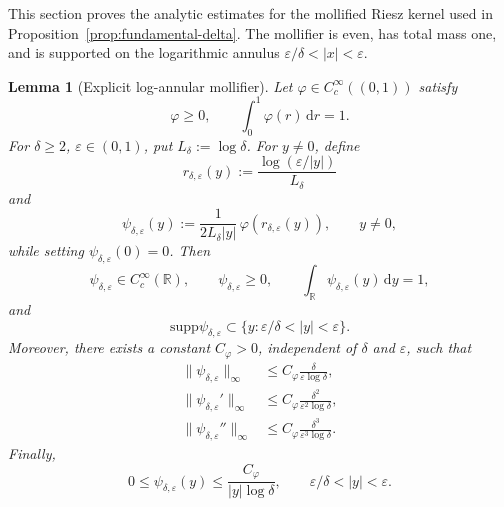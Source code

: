 \documentclass[10pt,a4paper]{amsart}
\newtheorem{lemma}[theorem]{Lemma}
\newcommand{\R}{\mathbb{R}}
\newcommand{\1}{\mathbf{1}}
\newcommand{\dd}{\,\mathrm{d}}
\newcommand{\eps}{\varepsilon}
\newcommand{\supp}{\mathrm{supp}}
\begin{document}
This section proves the analytic estimates for the mollified Riesz kernel used in Proposition~\ref{prop:fundamental-delta}. The mollifier is even, has total mass one, and is supported on the logarithmic annulus $\eps/\delta<|x|<\eps$.

\begin{lemma}[Explicit log-annular mollifier]
\label{lem:explicit-mollifier}
Let $\varphi\in C_c^\infty((0,1))$ satisfy
\[
  \varphi\ge0,\qquad \int_0^1\varphi(r)\dd r=1.
\]
For $\delta\ge2$, $\eps\in(0,1)$, put $L_\delta:=\log\delta$. For $y\ne0$, define
\[
  r_{\delta,\eps}(y):=\frac{\log(\eps/|y|)}{L_\delta}
\]
and
\begin{equation}\label{eq:explicit-psi}
  \psi_{\delta,\eps}(y)
  :=\frac{1}{2L_\delta |y|}\,\varphi\!\left(r_{\delta,\eps}(y)\right),
  \qquad y\ne0,
\end{equation}
while setting $\psi_{\delta,\eps}(0)=0$. Then
\[
  \psi_{\delta,\eps}\in C_c^\infty(\R),\qquad
  \psi_{\delta,\eps}\ge0,
  \qquad
  \int_\R\psi_{\delta,\eps}(y)\dd y=1,
\]
and
\[
  \supp\psi_{\delta,\eps}\subset\{y:\eps/\delta<|y|<\eps\}.
\]
Moreover, there exists a constant $C_\varphi>0$, independent of $\delta$ and $\eps$, such that
\begin{align}
  \|\psi_{\delta,\eps}\|_\infty
  &\le C_\varphi\frac{\delta}{\eps\log\delta}, \label{eq:psi0-bound}\\
  \|\psi_{\delta,\eps}'\|_\infty
  &\le C_\varphi\frac{\delta^2}{\eps^2\log\delta}, \label{eq:psi1-bound}\\
  \|\psi_{\delta,\eps}''\|_\infty
  &\le C_\varphi\frac{\delta^3}{\eps^3\log\delta}. \label{eq:psi2-bound}
\end{align}
Finally,
\begin{equation}\label{eq:psi-log-bound}
  0\le \psi_{\delta,\eps}(y)
  \le \frac{C_\varphi}{|y|\log\delta},
  \qquad \eps/\delta<|y|<\eps.
\end{equation}
\end{lemma}
\end{document}
